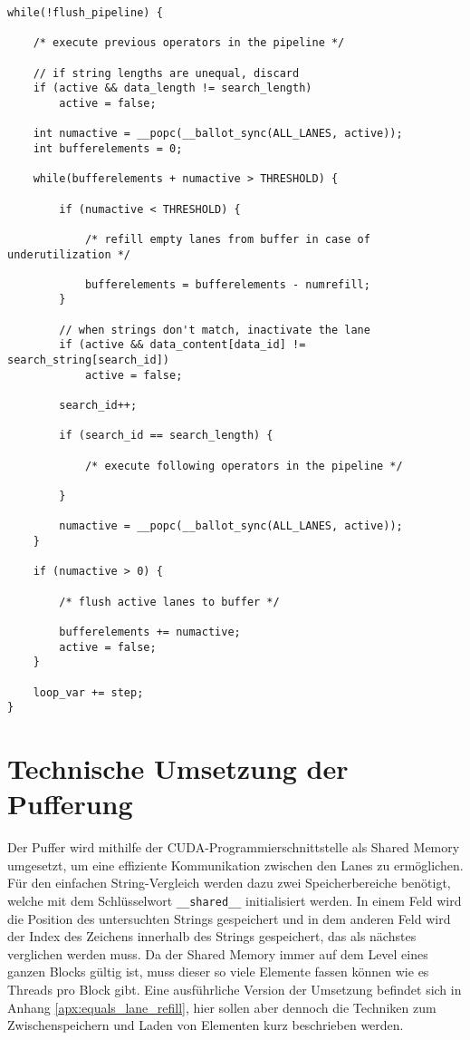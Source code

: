 \begin{lstlisting}[language=MyC++,
caption=Struktur der String-Selektion mit Lane Refill,
label=equals_lane_refill_code]
while(!flush_pipeline) {

	/* execute previous operators in the pipeline */
	
	// if string lengths are unequal, discard
	if (active && data_length != search_length)
		active = false;
	
	int numactive = __popc(__ballot_sync(ALL_LANES, active));
	int bufferelements = 0;
	
	while(bufferelements + numactive > THRESHOLD) {
	
		if (numactive < THRESHOLD) {
		
			/* refill empty lanes from buffer in case of underutilization */
			
			bufferelements = bufferelements - numrefill;
		}
		
		// when strings don't match, inactivate the lane
		if (active && data_content[data_id] != search_string[search_id])
			active = false;
		
		search_id++;
		
		if (search_id == search_length) {
		
			/* execute following operators in the pipeline */
		
		}
		
		numactive = __popc(__ballot_sync(ALL_LANES, active));
	}
		
	if (numactive > 0) {
	
		/* flush active lanes to buffer */
		
		bufferelements += numactive;
		active = false;
	}
	
	loop_var += step;
}
\end{lstlisting}

\section{Technische Umsetzung der Pufferung}

Der Puffer wird mithilfe der CUDA-Programmierschnittstelle als Shared Memory umgesetzt, um eine effiziente Kommunikation zwischen den Lanes zu ermöglichen.
Für den einfachen String-Vergleich werden dazu zwei Speicherbereiche benötigt, welche mit dem Schlüsselwort \texttt{\_\_shared\_\_} initialisiert werden.
In einem Feld wird die Position des untersuchten Strings gespeichert und in dem anderen Feld wird der Index des Zeichens innerhalb des Strings gespeichert, das als nächstes verglichen werden muss.
Da der Shared Memory immer auf dem Level eines ganzen Blocks gültig ist, muss dieser so viele Elemente fassen können wie es Threads pro Block gibt.
Eine ausführliche Version der Umsetzung befindet sich in Anhang \ref{apx:equals_lane_refill}, hier sollen aber dennoch die Techniken zum Zwischenspeichern und Laden von Elementen kurz beschrieben werden.

